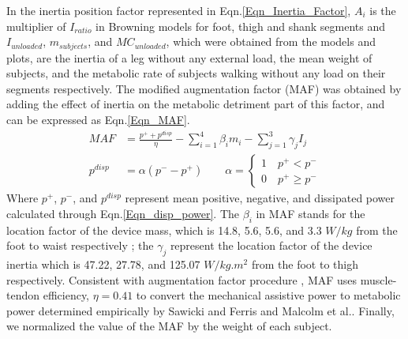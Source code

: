 \documentclass[10pt,letterpaper]{article}
\begin{document}
In the inertia position factor represented in Eqn.\eqref{Eqn_Inertia_Factor}, $A_i$ is the multiplier of $I_{ratio}$ in Browning models for foot, thigh and shank segments and $I_{unloaded}$, $m_{subjects}$, and $MC_{unloaded}$, which were obtained from the \cite{133} models and plots, are the inertia of a leg without any external load, the mean weight of subjects, and the metabolic rate of subjects walking without any load on their segments respectively. The modified augmentation factor (MAF) was obtained by adding the effect of inertia on the metabolic detriment part of this factor, and can be expressed as Eqn.\eqref{Eqn_MAF}.
\begin{align}
MAF &= \frac{p^{+}+p^{disp}}{\eta}-\sum_{i=1}^{4}\beta_{i}m_{i}-\sum_{j=1}^{3}\gamma_{j}I_{j}\label{Eqn_MAF}\\
p^{disp} &= \alpha(p^{-}-p^{+}) \qquad \alpha = \left\{\begin{array}{ll}1\quad p^{+}<p^{-}\\0\quad p^{+}\geq p^{-}\end{array}\right.\label{Eqn_disp_power}
\end{align}
Where $p^{+}$, $p^{-}$, and $p^{disp}$ represent mean positive, negative, and dissipated power calculated through Eqn.\eqref{Eqn_disp_power}. The $\beta_i$ in MAF stands for the location factor of the device mass, which is 14.8, 5.6, 5.6, and 3.3 $W/kg$ from the foot to waist respectively \cite{41,133}; the $\gamma_j$ represent the location factor of the device inertia which is 47.22, 27.78, and 125.07 $W/{kg.m^2}$ from the foot to thigh respectively. Consistent with augmentation factor procedure \cite{41}, MAF uses muscle-tendon efficiency, $\eta = 0.41$ to convert the mechanical assistive power to metabolic power determined empirically by Sawicki and Ferris\cite{149} and Malcolm et al.\cite{40}. Finally, we normalized the value of the MAF by the weight of each subject.
\end{document}
